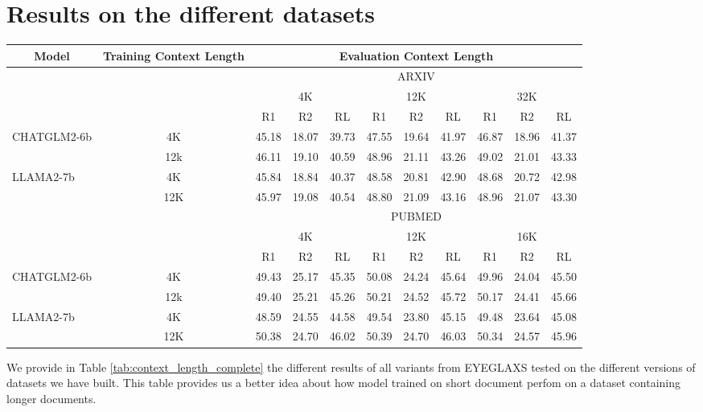 \appendix

\section{Results on the different datasets}

\begin{table*}
    \centering
    \small
    \begin{tabular}{|l|c|c|c|c|c|c|c|c|c|c|} \hline  
          \multicolumn{1}{|c|}{Model}&Training Context Length&  \multicolumn{9}{|c|}{Evaluation Context Length}\\ \hline  
 & & \multicolumn{9}{|c|}{ARXIV}\\ \hline  
  && \multicolumn{3}{|c|}{4K}& \multicolumn{3}{|c|}{12K}& \multicolumn{3}{|c|}{32K}\\ \hline  
 & & R1& R2& RL& R1& R2& RL& R1& R2&RL\\ \hline  
  CHATGLM2-6b&4K& 45.18& 18.07& 39.73& 47.55& 19.64& 41.97& 46.87& 18.96&41.37\\ \hline  
  &12k& 46.11& 19.10& 40.59& 48.96& 21.11& 43.26& 49.02& 21.01&43.33\\ \hline  
 LLAMA2-7b& 4K& 45.84& 18.84& 40.37& 48.58& 20.81& 42.90& 48.68& 20.72&42.98\\ \hline  
 & 12K& 45.97& 19.08& 40.54& 48.80& 21.09& 43.16& 48.96& 21.07&43.30\\ \hline  
 & & \multicolumn{9}{|c|}{PUBMED}\\ \hline  
  && \multicolumn{3}{|c|}{4K}& \multicolumn{3}{|c|}{12K}& \multicolumn{3}{|c|}{16K}\\ \hline  
 & & R1& R2& RL& R1& R2& RL& R1& R2&RL\\ \hline  
  CHATGLM2-6b&4K& 49.43& 25.17& 45.35& 50.08& 24.24& 45.64& 49.96& 24.04&45.50\\ \hline  
  &12k& 49.40& 25.21& 45.26& 50.21& 24.52& 45.72& 50.17& 24.41&45.66\\ \hline  
 LLAMA2-7b& 4K& 48.59& 24.55& 44.58& 49.54& 23.80& 45.15& 49.48& 23.64&45.08\\ \hline  
 & 12K& 50.38& 24.70& 46.02& 50.39& 24.70& 46.03& 50.34 &24.57 &45.96\\ \hline
    \end{tabular}
    \caption{ROUGE Metrics of EYEGLAXS Variants on ARXIV and PUBMED Datasets at Different Training and Evaluation Context Lengths.}
    \label{tab:context_length_complete}
\end{table*}

We provide in Table \ref{tab:context_length_complete} the different results of all variants from EYEGLAXS tested on the different versions of datasets we have built. This table provides us a better idea about how model trained on short document perfom on a dataset containing longer documents.

